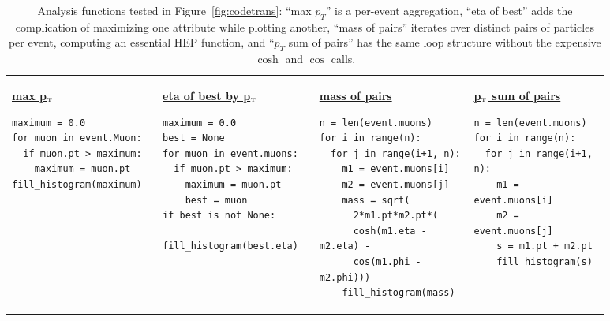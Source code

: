 \documentclass[a4paper]{jpconf}
\begin{document}
\begin{table}
\caption{\label{tab:code} Analysis functions tested in Figure~\ref{fig:codetrans}: ``max $p_T$'' is a per-event aggregation, ``eta of best'' adds the complication of maximizing one attribute while plotting another, ``mass of pairs'' iterates over distinct pairs of particles per event, computing an essential HEP function, and ``$p_T$ sum of pairs'' has the same loop structure without the expensive $\cosh$ and $\cos$ calls.}

\begin{center}
\begin{tabular}{p{0.21\linewidth} p{0.22\linewidth} p{0.24\linewidth} p{0.21\linewidth}}
\underline{{\small\bf max p$_{\mbox{\tiny T}}$}}
\begin{minipage}{\linewidth}\scriptsize
\begin{verbatim}
maximum = 0.0
for muon in event.Muon:
  if muon.pt > maximum:
    maximum = muon.pt
fill_histogram(maximum)
\end{verbatim}
\end{minipage} &
\underline{{\small\bf eta of best by p$_{\mbox{\tiny T}}$}}
\begin{minipage}{\linewidth}\scriptsize
\begin{verbatim}
maximum = 0.0
best = None
for muon in event.muons:
  if muon.pt > maximum:
    maximum = muon.pt
    best = muon
if best is not None:
  fill_histogram(best.eta)
\end{verbatim}
\end{minipage} &
\underline{{\small\bf mass of pairs}}
\begin{minipage}{\linewidth}\scriptsize
\begin{verbatim}
n = len(event.muons)
for i in range(n):
  for j in range(i+1, n):
    m1 = event.muons[i]
    m2 = event.muons[j]
    mass = sqrt(
      2*m1.pt*m2.pt*(
      cosh(m1.eta - m2.eta) -
      cos(m1.phi - m2.phi)))
    fill_histogram(mass)
\end{verbatim}
\end{minipage} &
\underline{{\small\bf p$_{\mbox{\tiny T}}$ sum of pairs}}
\begin{minipage}{\linewidth}\scriptsize
\begin{verbatim}
n = len(event.muons)
for i in range(n):
  for j in range(i+1, n):
    m1 = event.muons[i]
    m2 = event.muons[j]
    s = m1.pt + m2.pt
    fill_histogram(s)
\end{verbatim}
\end{minipage}
\end{tabular}
\end{center}
\end{table}
\end{document}
